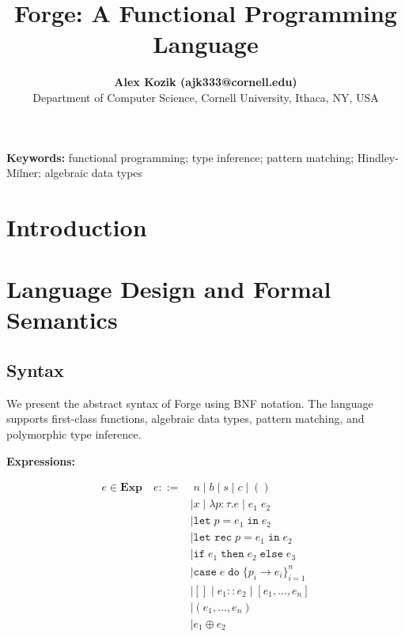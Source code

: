 \documentclass[10pt,letterpaper,twocolumn]{article}
\title{\Large\bfseries Forge: A Functional Programming Language}
\author{
  {\large\bfseries Alex Kozik (ajk333@cornell.edu)} \\
  {\normalsize Department of Computer Science, Cornell University, Ithaca, NY, USA}
}
\date{}
\begin{document}
\maketitle

\begin{abstract}
\small
{}

\end{abstract}

\noindent\textbf{Keywords:} functional programming; type inference; pattern matching; Hindley-Milner; algebraic data types

\section{Introduction}


\section{Language Design and Formal Semantics}

\subsection{Syntax}

We present the abstract syntax of Forge using BNF notation. The language supports first-class functions, algebraic data types, pattern matching, and polymorphic type inference.

\textbf{Expressions:}

\begin{align*}
e \in \textbf{Exp} \quad e ::= &\; n \mid b \mid s \mid c \mid () \\
&\mid x \mid \lambda p{:}\tau . e \mid e_1\;e_2 \\
&\mid \texttt{let}\;p = e_1\;\texttt{in}\;e_2 \\
&\mid \texttt{let rec}\;p = e_1\;\texttt{in}\;e_2 \\
&\mid \texttt{if}\;e_1\;\texttt{then}\;e_2\;\texttt{else}\;e_3 \\
&\mid \texttt{case}\;e\;\texttt{do}\;\{p_i \to e_i\}^n_{i=1} \\
&\mid [] \mid e_1 :: e_2 \mid [e_1, \ldots, e_n] \\
&\mid (e_1, \ldots, e_n) \\
&\mid e_1 \oplus e_2
\end{align*}
\end{document}
